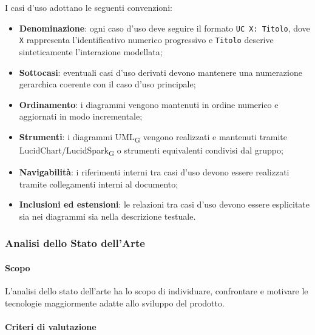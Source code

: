 I casi d'uso adottano le seguenti convenzioni:

\begin{itemize}
      \item \textbf{Denominazione}: ogni caso d'uso deve seguire il formato \texttt{UC X: Titolo}, dove \texttt{X} rappresenta l'identificativo numerico
      progressivo e \texttt{Titolo} descrive sinteticamente l'interazione modellata;

      \item \textbf{Sottocasi}: eventuali casi d'uso derivati devono mantenere una numerazione gerarchica coerente con il caso d'uso principale;
      
      \item \textbf{Ordinamento}: i diagrammi vengono mantenuti in ordine numerico e
      aggiornati in modo incrementale;

      \item \textbf{Strumenti}: i diagrammi UML\textsubscript{G} vengono realizzati e
      mantenuti tramite LucidChart/LucidSpark\textsubscript{G} o strumenti equivalenti condivisi dal
      gruppo;

      \item \textbf{Navigabilità}: i riferimenti interni tra casi d'uso devono essere
      realizzati tramite collegamenti interni al documento;

      \item \textbf{Inclusioni ed estensioni}: le relazioni tra casi d'uso devono essere
      esplicitate sia nei diagrammi sia nella descrizione testuale.
\end{itemize}


\subsubsection{Analisi dello Stato dell'Arte}

\paragraph{Scopo}

L'analisi dello stato dell'arte ha lo scopo di individuare, confrontare e motivare
le tecnologie maggiormente adatte allo sviluppo del prodotto.

\paragraph{Criteri di valutazione}


